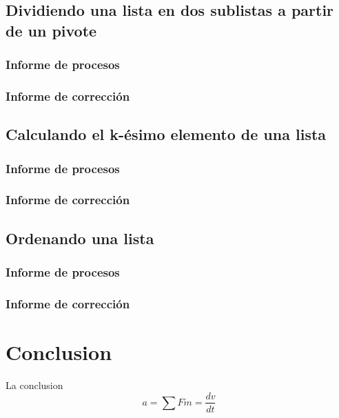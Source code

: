 \documentclass[12pt, a4paper]{article}
\begin{document}
\subsection{Dividiendo una lista en dos sublistas a partir de un pivote}
\subsubsection{Informe de procesos}
\subsubsection{Informe de corrección}
\subsection{Calculando el k-ésimo elemento de una lista}
\subsubsection{Informe de procesos}
\subsubsection{Informe de corrección}
\subsection{Ordenando una lista}
\subsubsection{Informe de procesos}
\subsubsection{Informe de corrección}
\section{Conclusion}
La conclusion
\newpage{}
\begin{displaymath}
 a = \sum F \dot m = \frac{dv}{dt}
\end{displaymath}
\end{document}
